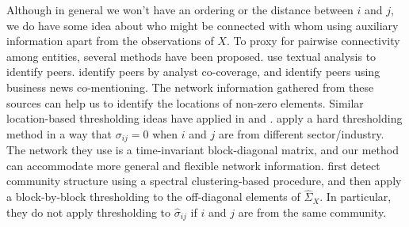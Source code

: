 

Although in general we won't have an ordering or the distance between $i$ and $j$, we do have some idea about who might be connected with whom using auxiliary information apart from the observations of ${X}$. To proxy for pairwise connectivity among entities, several methods have been proposed. 
\cite{hoberg2016text} use textual analysis to identify peers. \cite{kaustia2013common} identify peers by analyst co-coverage, and \cite{ge2021news} identify peers using business news co-mentioning. 
The network information gathered from these sources can help us to identify the locations of non-zero elements. Similar location-based thresholding ideas have applied in \cite{fan2016incorporating} and \cite{brownlees2020community}. \cite{fan2016incorporating} apply a hard thresholding method in a way that $\sigma_{ij}=0$ when $i$ and $j$ are from different sector/industry. The network they use is a time-invariant block-diagonal matrix, and our method can accommodate more general and flexible network information.
\cite{brownlees2020community} first detect community structure using a spectral clustering-based procedure, and then apply a block-by-block thresholding to the off-diagonal elements of ${\hat{\Sigma}_{X}}$. In particular, they do not apply thresholding to $\hat{\sigma}_{ij}$ if $i$ and $j$ are from the same community.



